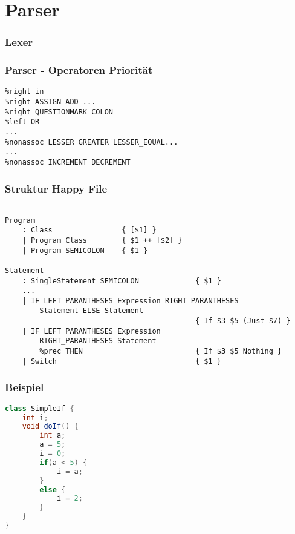 \section{Parser}

\begin{frame}
	\frametitle{Lexer}
\end{frame}

\begin{frame}[fragile]
	\frametitle{Parser - Operatoren Priorität}
	\begin{lstlisting}
%right in
%right ASSIGN ADD ...
%right QUESTIONMARK COLON
%left OR
...
%nonassoc LESSER GREATER LESSER_EQUAL...
...
%nonassoc INCREMENT DECREMENT
	\end{lstlisting}
\end{frame}

\begin{frame}[fragile]
	\frametitle{Struktur Happy File}
	\begin{lstlisting}[basicstyle=\tiny]
		
Program
    : Class                { [$1] }
    | Program Class        { $1 ++ [$2] }
    | Program SEMICOLON    { $1 }

Statement
    : SingleStatement SEMICOLON             { $1 }
	...
    | IF LEFT_PARANTHESES Expression RIGHT_PARANTHESES
        Statement ELSE Statement
                                            { If $3 $5 (Just $7) }
    | IF LEFT_PARANTHESES Expression
        RIGHT_PARANTHESES Statement
        %prec THEN                          { If $3 $5 Nothing }
    | Switch                                { $1 }
	\end{lstlisting}
\end{frame}

\begin{frame}[fragile]
	\frametitle{Beispiel}
	\begin{lstlisting}[language=Java, basicstyle=\tiny]
class SimpleIf {
	int i;
	void doIf() {
		int a;
		a = 5;
		i = 0;
		if(a < 5) {
			i = a;
		}
		else {
			i = 2;
		}
	}
}
	\end{lstlisting}
\end{frame}
